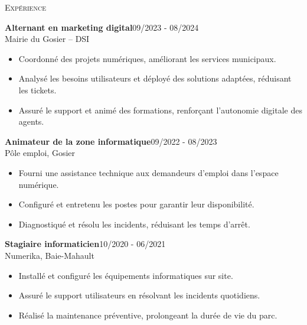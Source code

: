 \documentclass[11pt,a4paper]{article}
\newcommand{\headright}[1]{\vspace*{2.5ex}\textsc{\Large\color{cvblue}#1}\par%
  \vspace*{-2ex}{\color{cvblue}\hrulefill}\par}
\begin{document}
\begin{minipage}[t]{0.56\textwidth}
  \setlength{\parskip}{0.8ex}
  \vspace{2ex}

  \headright{Expérience}
  \colorbox{maincolor}{%
  \begin{minipage}{\linewidth}
    \noindent
    \textbf{Alternant en marketing digital}\hfill 09/2023 - 08/2024\\
    Mairie du Gosier – DSI\\[-0.3em]
    \begin{itemize}[leftmargin=*]
      \item Coordonné des projets numériques, améliorant les services municipaux. \item Analysé les besoins utilisateurs et déployé des solutions adaptées, réduisant les tickets. \item Assuré le support et animé des formations, renforçant l’autonomie digitale des agents.
    \end{itemize}
  \end{minipage}}

\vspace{3mm}

\colorbox{maincolor}{%
  \begin{minipage}{\linewidth}
    \noindent
    \textbf{Animateur de la zone informatique}\hfill 09/2022 - 08/2023\\
    Pôle emploi, Gosier\\[-0.3em]
    \begin{itemize}[leftmargin=*]
      \item Fourni une assistance technique aux demandeurs d’emploi dans l’espace numérique. \item Configuré et entretenu les postes pour garantir leur disponibilité. \item Diagnostiqué et résolu les incidents, réduisant les temps d’arrêt.
    \end{itemize}
  \end{minipage}}

\vspace{3mm}

\colorbox{maincolor}{%
  \begin{minipage}{\linewidth}
    \noindent
    \textbf{Stagiaire informaticien}\hfill 10/2020 - 06/2021\\
    Numerika, Baie-Mahault\\[-0.3em]
    \begin{itemize}[leftmargin=*]
      \item Installé et configuré les équipements informatiques sur site. \item Assuré le support utilisateurs en résolvant les incidents quotidiens. \item Réalisé la maintenance préventive, prolongeant la durée de vie du parc.
    \end{itemize}
  \end{minipage}}        %


\end{minipage}
\end{document}
